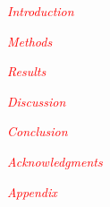\documentclass[prl,reprint,superscriptaddress]{revtex4-2}
\begin{document}




\date{\today}



\pacs{}

\maketitle

\textcolor{red}{\textit{Introduction}}


\textcolor{red}{\textit{Methods}}


\textcolor{red}{\textit{Results}}


\textcolor{red}{\textit{Discussion}}


\textcolor{red}{\textit{Conclusion}}


\textcolor{red}{\textit{Acknowledgments}}
\begin{acknowledgments}
 
\end{acknowledgments}

\appendix*
\textcolor{red}{\textit{Appendix}}




\end{document}

